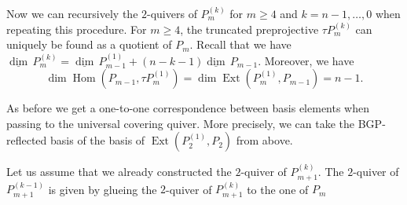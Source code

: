 \documentclass{amsart}
\newcommand\udim{{\underline{\dim}\, }}
\newcommand{\Ext}{\operatorname{Ext}}
\newcommand{\Hom}{\operatorname{Hom}}
\begin{document}
Now we can recursively the $2$-quivers of $P_m^{(k)}$ for $m\geq 4$ and $k=n-1,\ldots,0$ when repeating this procedure. For $m\geq 4$, the truncated preprojective $\tau P_m^{(k)}$ can uniquely be found as a quotient of $P_m$.
Recall that we have $\udim P_m^{(k)}=\udim P_{m-1}^{(1)}+(n-k-1)\udim P_{m-1}$. Moreover, we have 
\[\dim \Hom(P_{m-1},\tau P_m^{(1)})=\dim\Ext(P_m^{(1)},P_{m-1})=n-1.\]

As before we get a one-to-one correspondence between basis elements when passing to the universal covering quiver. More precisely, we can take the BGP-reflected basis of the basis of $\Ext(P_2^{(1)},P_2)$ from above.

Let us assume that we already constructed the $2$-quiver of $P_{m+1}^{(k)}$. The $2$-quiver of $P^{(k-1)}_{m+1}$ is given by glueing the $2$-quiver of $P_{m+1}^{(k)}$ to the one of $P_{m}$
\\
\end{document}
